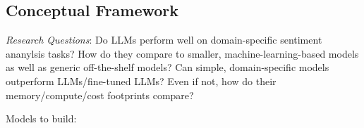 \subsection{Conceptual Framework}



\emph{Research Questions}: Do LLMs perform well on domain-specific sentiment ananylsis tasks? How do they compare to smaller, machine-learning-based models as well as generic off-the-shelf models? Can simple, domain-specific models outperform LLMs/fine-tuned LLMs? Even if not, how do their memory/compute/cost footprints compare? 

Models to build:










